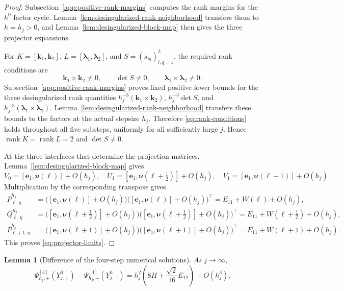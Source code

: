 \documentclass[]{article}
\numberwithin{equation}{section}
\theoremstyle{plain}
\newtheorem{lemma}[theorem]{Lemma}
\theoremstyle{remark}
\newcommand{\rank}{\operatorname{rank}}
\begin{document}
\begin{proof}
Subsection~\ref{app:positive-rank-margins} computes the rank margins for
the $h^0$ factor cycle.  Lemma~\ref{lem:desingularized-rank-neighborhood}
transfers them to $h=h_j>0$, and
Lemma~\ref{lem:desingularized-block-map} then gives the three projector
expansions.

For
$K=[\boldsymbol k_1,\boldsymbol k_2]$,
$L=[\boldsymbol\lambda_1,\boldsymbol\lambda_2]$, and
$S=(s_{iq})_{i,q=1}^2$, the required rank conditions are
\begin{equation}\label{eq:rank-conditions}
 \boldsymbol k_1\times\boldsymbol k_2\ne0,
 \qquad \det S\ne0,
 \qquad \boldsymbol\lambda_1\times\boldsymbol\lambda_2\ne0.
\end{equation}
Subsection~\ref{app:positive-rank-margins} proves fixed positive lower
bounds for the three desingularized rank quantities
$h_j^{-3}(\boldsymbol k_1\times\boldsymbol k_2)$,
$h_j^{-3}\det S$, and
$h_j^{-3}(\boldsymbol\lambda_1\times\boldsymbol\lambda_2)$.
Lemma~\ref{lem:desingularized-rank-neighborhood} transfers
these bounds to the factors at the actual stepsize $h_j$.  Therefore
\eqref{eq:rank-conditions} holds throughout all five substeps,
uniformly for all sufficiently large $j$.  Hence
$\rank K=\rank L=2$ and $\det S\ne0$.

At the three interfaces that determine the projection matrices,
Lemma~\ref{lem:desingularized-block-map} gives
\[
 V_0=[\boldsymbol e_1,\boldsymbol\nu(\ell)]+O(h_j),\quad
 U_1=[\boldsymbol e_1,\boldsymbol\nu(\ell+\tfrac12)]+O(h_j),\quad
 V_1=[\boldsymbol e_1,\boldsymbol\nu(\ell+1)]+O(h_j).
\]
Multiplication by the corresponding transpose gives
\begin{align*}
 P^{h_j}_{\ell,\eta}
 &=\bigl([\boldsymbol e_1,\boldsymbol\nu(\ell)]+O(h_j)\bigr)
   \bigl([\boldsymbol e_1,\boldsymbol\nu(\ell)]+O(h_j)\bigr)^\top
   =E_{11}+W(\ell)+O(h_j),\\
 Q^{h_j}_{\ell,\eta}
 &=\bigl([\boldsymbol e_1,\boldsymbol\nu(\ell+\tfrac12)]+O(h_j)\bigr)
   \bigl([\boldsymbol e_1,\boldsymbol\nu(\ell+\tfrac12)]+O(h_j)\bigr)^\top
   =E_{11}+W(\ell+\tfrac12)+O(h_j),\\
 P^{h_j}_{\ell+1,\eta}
 &=\bigl([\boldsymbol e_1,\boldsymbol\nu(\ell+1)]+O(h_j)\bigr)
   \bigl([\boldsymbol e_1,\boldsymbol\nu(\ell+1)]+O(h_j)\bigr)^\top
   =E_{11}+W(\ell+1)+O(h_j).
\end{align*}
This proves \eqref{eq:projector-limits}.
\end{proof}

\begin{lemma}[Difference of the four-step numerical solutions]
\label{lem:numerical-difference}
As $j\to\infty$,
\begin{equation}\label{eq:numerical-difference}
 \Psi^{[4]}_{h_j,+}(Y_{j,+}^0)-\Psi^{[4]}_{h_j,-}(Y_{j,-}^0)
 =h_j^2\left(8H+\frac{\sqrt2}{16}E_{12}\right)+O(h_j^3).
\end{equation}
\end{lemma}
\end{document}
